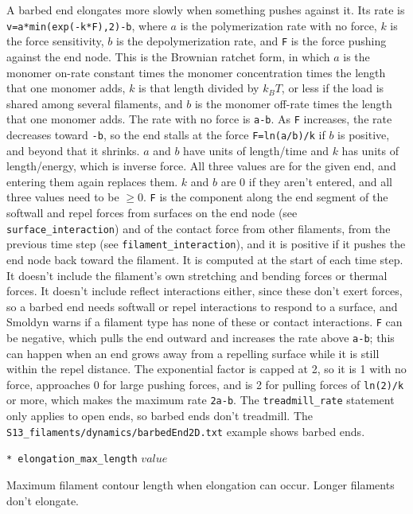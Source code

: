 \documentclass {scrbook}
\newcommand {\ttt} {\texttt}
\begin{document}
\begin{description}
A barbed end elongates more slowly when something pushes against it. Its rate is \ttt{v=a*min(exp(-k*F),2)-b}, where $a$ is the polymerization rate with no force, $k$ is the force sensitivity, $b$ is the depolymerization rate, and \ttt{F} is the force pushing against the end node. This is the Brownian ratchet form, in which $a$ is the monomer on-rate constant times the monomer concentration times the length that one monomer adds, $k$ is that length divided by $k_BT$, or less if the load is shared among several filaments, and $b$ is the monomer off-rate times the length that one monomer adds. The rate with no force is \ttt{a-b}. As \ttt{F} increases, the rate decreases toward \ttt{-b}, so the end stalls at the force \ttt{F=ln(a/b)/k} if $b$ is positive, and beyond that it shrinks. $a$ and $b$ have units of length/time and $k$ has units of length/energy, which is inverse force. All three values are for the given end, and entering them again replaces them. $k$ and $b$ are 0 if they aren't entered, and all three values need to be $\geq 0$. \ttt{F} is the component along the end segment of the softwall and repel forces from surfaces on the end node (see \ttt{surface\_interaction}) and of the contact force from other filaments, from the previous time step (see \ttt{filament\_interaction}), and it is positive if it pushes the end node back toward the filament. It is computed at the start of each time step. It doesn't include the filament's own stretching and bending forces or thermal forces. It doesn't include reflect interactions either, since these don't exert forces, so a barbed end needs softwall or repel interactions to respond to a surface, and Smoldyn warns if a filament type has none of these or contact interactions. \ttt{F} can be negative, which pulls the end outward and increases the rate above \ttt{a-b}; this can happen when an end grows away from a repelling surface while it is still within the repel distance. The exponential factor is capped at 2, so it is 1 with no force, approaches 0 for large pushing forces, and is 2 for pulling forces of \ttt{ln(2)/k} or more, which makes the maximum rate \ttt{2a-b}. The \ttt{treadmill\_rate} statement only applies to open ends, so barbed ends don't treadmill. The \ttt{S13\_filaments/dynamics/barbedEnd2D.txt} example shows barbed ends.

\item{\ttt{* elongation\_max\_length} $value$} %

Maximum filament contour length when elongation can occur. Longer filaments don't elongate.


\end{description}
\end{document}
